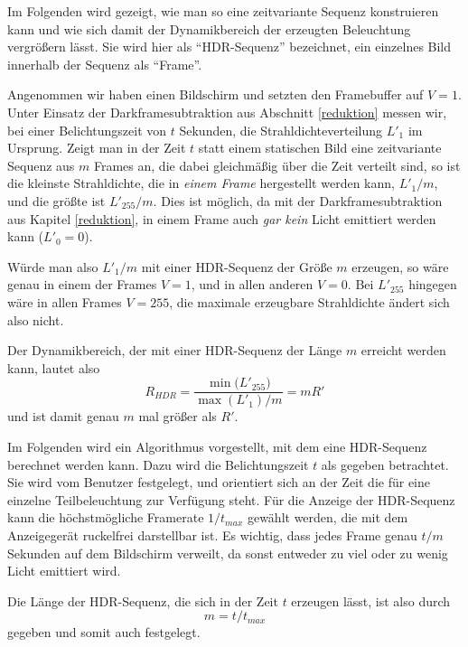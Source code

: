     Im Folgenden wird gezeigt, wie man so eine zeitvariante Sequenz konstruieren kann und wie sich damit der Dynamikbereich der erzeugten Beleuchtung vergrößern lässt.
    Sie wird hier als ``HDR-Sequenz'' bezeichnet, ein einzelnes Bild innerhalb der Sequenz  als ``Frame''.
   
    Angenommen wir haben einen Bildschirm und setzten den Framebuffer auf $V=1$. 
    Unter Einsatz der Darkframesubtraktion aus Abschnitt \ref{reduktion} messen wir, bei einer Belichtungszeit von $t$ Sekunden, die Strahldichteverteilung $L'_{1}$ im Ursprung.
    Zeigt man in der Zeit $t$ statt einem statischen Bild eine zeitvariante Sequenz aus $m$ Frames an, die dabei gleichmäßig über die Zeit verteilt sind, so ist die kleinste Strahldichte, die in \emph{einem Frame} hergestellt werden kann, $L'_{1}/m$, und die größte ist $L'_{255}/m$.
    Dies ist möglich, da mit der Darkframesubtraktion aus Kapitel \ref{reduktion},  in einem Frame auch \emph{gar kein} Licht emittiert werden kann ($L'_{0} = 0$).
    
    Würde man also $L'_{1}/m$ mit einer HDR-Sequenz der Größe $m$ erzeugen, so wäre genau in einem der Frames $V=1$, und in allen anderen $V=0$. 
    Bei  $L'_{255}$ hingegen wäre in allen Frames $V=255$, die maximale erzeugbare Strahldichte ändert sich also nicht.
 
    Der Dynamikbereich, der mit einer HDR-Sequenz der Länge $m$ erreicht werden kann, lautet also
    \begin{equation}
      R_{HDR} = \frac{ \min{ (L'_{255}}) } { \max{ (L'_{1})}/m} = mR'
    \end{equation}
    und ist damit genau $m$ mal größer als $R'$.
 
    Im Folgenden wird ein Algorithmus vorgestellt, mit dem eine HDR-Sequenz berechnet werden kann.
    Dazu wird die Belichtungszeit $t$ als gegeben betrachtet. 
    Sie wird vom Benutzer festgelegt, und orientiert sich an der Zeit die für eine einzelne Teilbeleuchtung zur Verfügung steht.
    Für die Anzeige der HDR-Sequenz kann die höchstmögliche Framerate $1/t_{max}$ gewählt werden, die mit dem Anzeigegerät ruckelfrei darstellbar ist. Es wichtig, dass jedes Frame genau $t/m$ Sekunden auf dem Bildschirm verweilt, da sonst entweder zu viel oder zu wenig Licht emittiert wird.

    Die Länge der HDR-Sequenz, die sich in der Zeit $t$ erzeugen lässt, ist also durch 
    \begin{equation}
     m=t/t_{max}
    \end{equation}
    gegeben und somit auch festgelegt.

